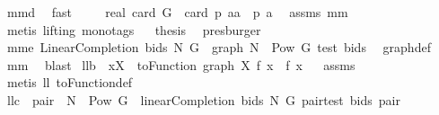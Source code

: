 \begin{isabellebody}
\isamarkupfalse%
\ mm{}{}d\ \isamarkupfalse%
\ fast\isanewline
{}\isamarkupfalse%
\ \isamarkupfalse%
\ {\isachardoublequoteopen}{\isachardot}{\isachardot}{\isachardot}\ {\isacharequal}\ real\ {\isacharparenleft}card\ G{\isacharparenright}\ {\isacharminus}\ card\ {\isacharparenleft}{\isacharquery}p\ aa\ {\isasyminter}\ {\isacharparenleft}{\isacharquery}p\ a{\isacharparenright}{\isacharparenright}{\isachardoublequoteclose}\ \isamarkupfalse%
\ assms\ mm{}{}\ \isanewline
{}\isamarkupfalse%
\ {\isacharparenleft}metis\ {\isacharparenleft}lifting{\isacharcomma}\ mono{\isacharunderscore}tags{\isacharparenright}{\isacharparenright}\isanewline
{}\isamarkupfalse%
\ \isamarkupfalse%
\ {\isacharquery}thesis\ \isamarkupfalse%
\ presburger\isanewline
{}\isamarkupfalse%
%
\endisatagproof
{\isafoldproof}%
%
\isadelimproof
\isanewline
%
\endisadelimproof
\isanewline
{}\isamarkupfalse%
\ mm{}{}e{\isacharcolon}\ {\isachardoublequoteopen}LinearCompletion\ bids\ N\ G\ {\isacharequal}\ graph\ {\isacharparenleft}N\ {\isasymtimes}\ {\isacharparenleft}Pow\ G{\isacharminus}{\isacharbraceleft}{\isacharbraceleft}{\isacharbraceright}{\isacharbraceright}{\isacharparenright}{\isacharparenright}\ {\isacharparenleft}test\ bids{\isacharparenright}{\isachardoublequoteclose}\ \isanewline
%
\isadelimproof
%
\endisadelimproof
%
\isatagproof
{}\isamarkupfalse%
\ graph{\isacharunderscore}def\ \isamarkupfalse%
\ mm{}{}\ \isamarkupfalse%
\ blast%
\endisatagproof
{\isafoldproof}%
%
\isadelimproof
\isanewline
%
\endisadelimproof
{}\isamarkupfalse%
\ ll{}{}b{\isacharcolon}\ \ {\isachardoublequoteopen}x{\isasymin}X{\isachardoublequoteclose}\ \ {\isachardoublequoteopen}toFunction\ {\isacharparenleft}graph\ X\ f{\isacharparenright}\ x\ {\isacharequal}\ f\ x{\isachardoublequoteclose}%
\isadelimproof
\ %
\endisadelimproof
%
\isatagproof
{}\isamarkupfalse%
\ assms\ \isanewline
{}\isamarkupfalse%
\ {\isacharparenleft}metis\ ll{}{}\ toFunction{\isacharunderscore}def{\isacharparenright}%
\endisatagproof
{\isafoldproof}%
%
\isadelimproof
%
\endisadelimproof
\isanewline
{}\isamarkupfalse%
\ ll{}{}c{\isacharcolon}\ \ {\isachardoublequoteopen}pair\ {\isasymin}\ N\ {\isasymtimes}\ {\isacharparenleft}Pow\ G{\isacharminus}{\isacharbraceleft}{\isacharbraceleft}{\isacharbraceright}{\isacharbraceright}{\isacharparenright}{\isachardoublequoteclose}\ \ {\isachardoublequoteopen}linearCompletion{\isacharprime}\ bids\ N\ G\ pair{\isacharequal}test\ bids\ pair{\isachardoublequoteclose}\isanewline

\end{isabellebody}
